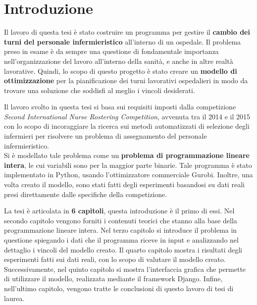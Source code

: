 \chapter{Introduzione}\label{ch:introduzione}
Il lavoro di questa tesi è stato costruire un programma per gestire il \textbf{cambio dei turni del personale infermieristico} all'interno di un ospedale.
Il problema preso in esame è da sempre una questione di fondamentale importanza nell'organizzazione del lavoro all'interno della sanità, e anche in altre realtà lavorative. Quindi, lo scopo di questo progetto è stato creare un \textbf{modello di ottimizzazione} per la pianificazione dei turni lavorativi ospedalieri in modo da trovare una soluzione che soddisfi al meglio i vincoli desiderati.

Il lavoro svolto in questa tesi si basa sui requisiti imposti dalla competizione \textit{Second International Nurse Rostering Competition}, avvenuta tra il 2014 e il 2015 con lo scopo di incoraggiare la ricerca sui metodi automatizzati di selezione degli infermieri per risolvere un problema di assegnamento del personale infermieristico.\\

Si è modellato tale problema come un \textbf{problema di programmazione lineare intera}, le cui variabili sono per la maggior parte binarie. 
Tale programma è stato implementato in Python, usando l'ottimizzatore commerciale Gurobi. Inoltre, una volta creato il modello, sono stati fatti degli esperimenti basandosi su dati reali presi direttamente dalle specifiche della competizione.

La tesi è articolata in \textbf{6 capitoli}, questa introduzione è il primo di essi.
Nel secondo capitolo vengono forniti i contenuti teorici che stanno alla base della programmazione lineare intera. Nel terzo capitolo si introduce il problema in questione spiegando i dati che il programma riceve in input e analizzando nel dettaglio i vincoli del modello creato.
Il quarto capitolo mostra i risultati degli esperimenti fatti sui dati reali, con lo scopo di valutare il modello creato.
Successivamente, nel quinto capitolo si mostra l'interfaccia grafica che permette di utilizzare il modello, realizzata mediante il framework Django.
Infine, nell'ultimo capitolo, vengono tratte le conclusioni di questo lavoro di tesi di laurea.



 